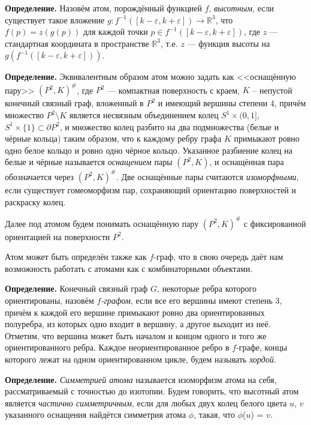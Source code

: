 \textbf{Определение. }
	Назовём атом, порождённый функцией $f$, {\em высотным}, если существует такое вложение $g
	\colon f^{-1}([k-\varepsilon, k+\varepsilon ]) \to \mathbb{R}^3$, что $f(p) = z(g(p))$ для каждой точки $p \in f^{-1}([k-\varepsilon, k+\varepsilon ])$, где $z$
	--- стандартная координата в пространстве $\mathbb R^3$, т.е. $z$ --- функция высоты на $g(f^{-1}([k-\varepsilon, k+\varepsilon ]))$.
	
			


\textbf{Определение.} Эквивалентным образом атом можно задать как <<оснащённую пару>>  $(P^2, K)^\#$, где $P^2$ --- компактная 	 поверхность с краем, $K$ -- непустой конечный связный граф, вложенный в $P^2$ и имеющий вершины		степени  $4$, причём множество $P^2 \setminus K$ является несвязным		объединением колец $S^1 \times (0, 1]$, $ S^1 \times \{1\} \subset\partial P^2$, и  множество колец разбито на два подмножества (белые и чёрные кольца) таким образом, что 	к каждому ребру графа $K$ примыкают ровно одно белое кольцо и ровно одно чёрное кольцо. 	Указанное разбиение колец  на белые и чёрные называется {\em 	оснащением} пары $(P^2, K)$, и оснащённая пара обозначается через $(P^2, K)^\#$.	Две  оснащённые пары считаются {\em изоморфными}, если существует	 гомеоморфизм  пар, сохраняющий ориентацию поверхностей  и раскраску колец.


Далее под атомом будем понимать оснащённую пару $(P^2, K)^\#$ с фиксированной ориентацией на поверхности $P^2$.



Атом может быть определён также как $f$-граф, что в свою очередь даёт нам возможность работать с атомами как с комбинаторными объектами.



\textbf{Определение.} %
Конечный связный граф $G$, некоторые ребра которого ориентированы, назовём {\em
 $f$-графом}, если все его вершины имеют степень $3$, причём к каждой его
вершине примыкают ровно два ориентированных полуребра, из которых одно входит в вершину,
а другое выходит из неё. Отметим, что вершина может быть началом и концом одного и того
же ориентированного ребра. Каждое неориентированное ребро в $f$-графе, концы которого лежат на одном ориентированном цикле,  будем называть { \em хордой}.



{\bf Определение.}
	{\em Симметрией атома}  называется изоморфизм  атома на себя, рассматриваемый с точностью до изотопии. Будем говорить, что  высотный атом   является {\em частично симметричным}, если для любых двух колец белого  цвета $u$, $v$ указанного оснащения найдётся симметрия атома $\phi $, такая, что  $\phi$($u$) = $v$.
	
